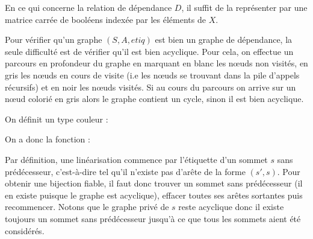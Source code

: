 En ce qui concerne la relation de dépendance $D$, il suffit de la représenter par une matrice carrée de booléens indexée par les éléments de $X$.
\medskip

Pour vérifier qu'un graphe $(S,A,etiq)$ est bien un graphe de dépendance, la seule difficulté est de vérifier qu'il est bien acyclique. Pour cela, on effectue un parcours en profondeur du graphe en marquant en blanc les nœuds non visités, en gris les nœuds en cours de visite (i.e les nœuds se trouvant dans la pile d'appels récursifs) et en noir les nœuds visités. Si au cours du parcours on arrive sur un nœud colorié en gris alors le graphe contient un cycle, sinon il est bien acyclique.
\medskip

On définit un type couleur :





On a donc la fonction :



\Q
Par définition, une linéarisation commence par l'étiquette d'un sommet $s$ sans prédécesseur, c'est-à-dire tel qu'il n'existe pas d'arête de la forme $(s',s)$. Pour obtenir une bijection fiable, il faut donc trouver un sommet sans prédécesseur (il en existe puisque le graphe est acyclique), effacer toutes ses arêtes sortantes puis recommencer. Notons que le graphe privé de $s$ reste acyclique donc il existe toujours un sommet sans prédécesseur jusqu'à ce que tous les sommets aient été considérés.



\Fin
